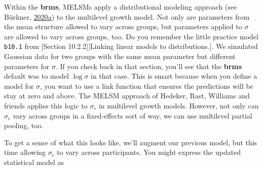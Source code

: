 \documentclass[]{article}
\begin{document}
Within the \textbf{brms}, MELSMs apply a distributional modeling
approach (see Bürkner,
\protect\hyperlink{ref-Buxfcrkner2020Distributional}{2020}\protect\hyperlink{ref-Buxfcrkner2020Distributional}{a})
to the multilevel growth model. Not only are parameters from the mean
structure allowed to vary across groups, but parameters applied to
\(\sigma\) are allowed to vary across groups, too. Do you remember the
little practice model \texttt{b10.1} from {[}Section 10.2.2{]}{[}Linking
linear models to distributions.{]}. We simulated Gaussian data for two
groups with the same mean parameter but different parameters for
\(\sigma\). If you check back in that section, you'll see that the
\textbf{brms} default was to model \(\log \sigma\) in that case. This is
smart because when you define a model for \(\sigma\), you want to use a
link function that ensures the predictions will be stay at zero and
above. The MELSM approach of Hedeker, Rast, Williams and friends applies
this logic to \(\sigma_\epsilon\) in multilevel growth models. However,
not only can \(\sigma_\epsilon\) vary across groups in a fixed-effects
sort of way, we can use multilevel partial pooling, too.

To get a sense of what this looks like, we'll augment our previous
model, but this time allowing \(\sigma_\epsilon\) to vary across
participants. You might express the updated statistical model as
\end{document}
